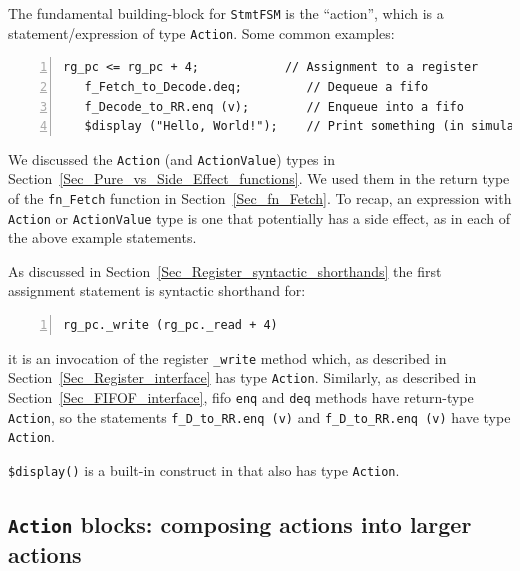 
The fundamental building-block for \verb|StmtFSM| is the ``action'',
which is a statement/expression of type \verb|Action|.  Some common
examples:

{\footnotesize
\begin{Verbatim}[frame=single, numbers=left]
   rg_pc <= rg_pc + 4;            // Assignment to a register
   f_Fetch_to_Decode.deq;         // Dequeue a fifo
   f_Decode_to_RR.enq (v);        // Enqueue into a fifo
   $display ("Hello, World!");    // Print something (in simulation only)
\end{Verbatim}
}

We discussed the \verb|Action| (and \verb|ActionValue|) types in
Section~\ref{Sec_Pure_vs_Side_Effect_functions}.  We used them in the
return type of the \verb|fn_Fetch| function in
Section~\ref{Sec_fn_Fetch}.  To recap, an expression with
\verb|Action| or \verb|ActionValue| type is one that potentially has a
side effect, as in each of the above example statements.

As discussed in Section~\ref{Sec_Register_syntactic_shorthands} the
first assignment statement is syntactic shorthand for:

{\footnotesize
\begin{Verbatim}[frame=single, numbers=left]
   rg_pc._write (rg_pc._read + 4)
\end{Verbatim}
}

{\ie} it is an invocation of the register \verb|_write| method which,
as described in
Section~\ref{Sec_Register_interface} has type
\verb|Action|.  Similarly, as described in
Section~\ref{Sec_FIFOF_interface}, fifo \verb|enq|
and \verb|deq| methods have return-type \verb|Action|, so the
statements \verb|f_D_to_RR.enq (v)| and \verb|f_D_to_RR.enq (v)| have
type \verb|Action|.


\verb|$display()| is a built-in construct in {\BSV} that also has type
\verb|Action|.


\subsection{{\tt Action} blocks: composing actions into larger actions}


